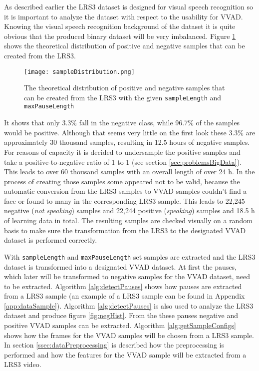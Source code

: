 As described earlier the LRS3 dataset is designed for visual speech recognition so it is important to analyze the dataset with respect to the usability for VVAD. Knowing the visual speech recognition background of the dataset it is quite obvious that the produced binary dataset will be very imbalanced. Figure \ref{fig:sampleDistribution} shows the theoretical distribution of positive and negative samples that can be created from the LRS3.
\begin{figure}
  \centering
  \texttt{[image: sampleDistribution.png]}
  \caption{The theoretical distribution of positive and negative samples that can be created from the LRS3 with the given \texttt{sampleLength} and \texttt{maxPauseLength}}
  \label{fig:sampleDistribution}
\end{figure}
It shows that only 3.3\% fall in the negative class, while 96.7\% of the samples would be positive. Although that seems very little on the first look these 3.3\% are approximately 30 thousand samples, resulting in 12.5 hours of negative samples. 
For reasons of capacity it is decided to undersample the positive samples and take a positive-to-negative ratio of 1 to 1 (see section \ref{sec:problemsBigData}). 
This leads to over 60 thousand samples with an overall length of over 24 h.
In the process of creating those samples some appeared not to be valid, because the automatic conversion from the LRS3 samples to VVAD samples couldn't find a face or found to many in the corresponding LRS3 sample. 
This leads to 22,245 negative (\emph{not speaking}) samples and 22,244 positive (\emph{speaking}) samples and 18.5 h of learning data in total. 
The resulting samples are checked visually on a random basis to make sure the transformation from the LRS3 to the designated VVAD dataset is performed correctly.


With \texttt{sampleLength} and \texttt{maxPauseLength} set samples are extracted and the LRS3 dataset is transformed into a designated VVAD dataset.
At first the pauses, which later will be transformed to negative samples for the VVAD dataset, need to be extracted. 
Algorithm \ref{alg:detectPauses} shows how pauses are extracted from a LRS3 sample (an example of a LRS3 sample can be found in Appendix \ref{app:dataSample}).
Algorithm \ref{alg:detectPauses} is also used to analyze the LRS3 dataset and produce figure \ref{fig:negHist}.
From the these pauses negative and positive VVAD samples can be extracted.
Algorithm \ref{alg:getSampleConfigs} shows how the frames for the VVAD samples will be chosen from a LRS3 sample.
In section \ref{ssec:dataPreprocessing} is described how the preprocessing is performed and how the features for the VVAD sample will be extracted from a LRS3 video.

